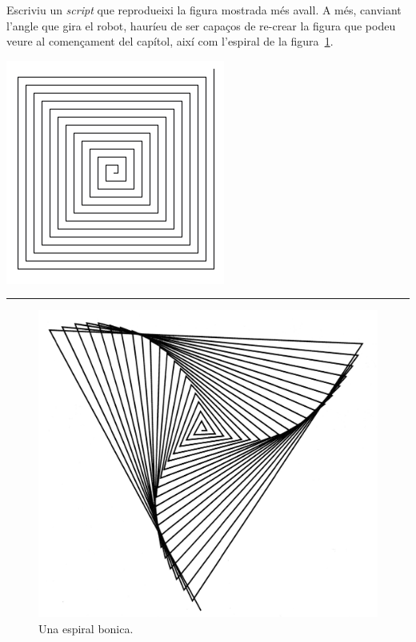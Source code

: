 \begin{center}
\colorbox{black}{}
\end{center}
{\small
\noindent
Escriviu un \emph{script} que reprodueixi la figura mostrada més avall. A més, canviant l'angle que gira el robot, hauríeu de ser capaços de re-crear la figura que podeu veure al començament del capítol, així com l'espiral de la figura~\ref{fig1003}. }
\begin{center}
\includegraphics[scale=0.5]{Imatges/figuraE10-3.png}
\end{center}
\noindent
\rule{\textwidth}{3pt}

\begin{figure}[h!]
\begin{center}
\includegraphics[scale=0.1]{Imatges/figura10-3.jpg}
\end{center}
\caption{Una espiral bonica.}
\label{fig1003}
\end{figure}

